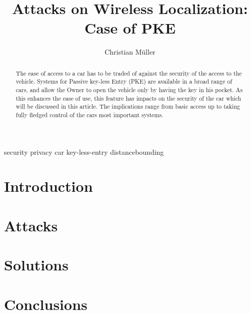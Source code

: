 \documentclass[draft,a4paper]{IEEEtran}
\title{Attacks on Wireless Localization: Case of PKE}
\author{Christian Müller}
\begin{document}
\maketitle
\begin{IEEEkeywords}
security privacy car key-less-entry distancebounding
\end{IEEEkeywords}


\begin{abstract}
The ease of access to a car has to be traded of against the security of the
access to the vehicle.
Systems for Passive key-less Entry (PKE) are available in a broad range of cars,
and allow the Owner to open the vehicle only by having the key in his pocket.
As this enhances the ease of use, this feature has impacts on the security of
the car which will be discussed in this article. The implications range from 
basic access up to taking fully fledged control of the cars most important
systems.
\end{abstract}

\section{Introduction}
	

\section{Attacks}
	

\section{Solutions}


\section{Conclusions}
\end{document}
